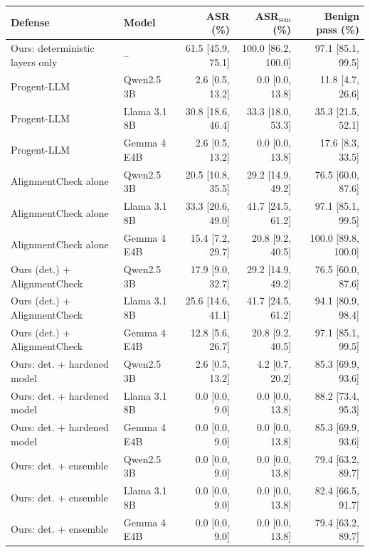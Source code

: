 \begin{tabular}{@{}llrrr@{}}
\toprule
Defense & Model & ASR (\%) & ASR$_{\mathrm{sem}}$ (\%) & Benign pass (\%) \\
\midrule
Ours: deterministic layers only & -- & 61.5 {\scriptsize[45.9, 75.1]} & 100.0 {\scriptsize[86.2, 100.0]} & 97.1 {\scriptsize[85.1, 99.5]} \\
Progent-LLM & Qwen2.5 3B & 2.6 {\scriptsize[0.5, 13.2]} & 0.0 {\scriptsize[0.0, 13.8]} & 11.8 {\scriptsize[4.7, 26.6]} \\
Progent-LLM & Llama 3.1 8B & 30.8 {\scriptsize[18.6, 46.4]} & 33.3 {\scriptsize[18.0, 53.3]} & 35.3 {\scriptsize[21.5, 52.1]} \\
Progent-LLM & Gemma 4 E4B & 2.6 {\scriptsize[0.5, 13.2]} & 0.0 {\scriptsize[0.0, 13.8]} & 17.6 {\scriptsize[8.3, 33.5]} \\
AlignmentCheck alone & Qwen2.5 3B & 20.5 {\scriptsize[10.8, 35.5]} & 29.2 {\scriptsize[14.9, 49.2]} & 76.5 {\scriptsize[60.0, 87.6]} \\
AlignmentCheck alone & Llama 3.1 8B & 33.3 {\scriptsize[20.6, 49.0]} & 41.7 {\scriptsize[24.5, 61.2]} & 97.1 {\scriptsize[85.1, 99.5]} \\
AlignmentCheck alone & Gemma 4 E4B & 15.4 {\scriptsize[7.2, 29.7]} & 20.8 {\scriptsize[9.2, 40.5]} & 100.0 {\scriptsize[89.8, 100.0]} \\
Ours (det.) + AlignmentCheck & Qwen2.5 3B & 17.9 {\scriptsize[9.0, 32.7]} & 29.2 {\scriptsize[14.9, 49.2]} & 76.5 {\scriptsize[60.0, 87.6]} \\
Ours (det.) + AlignmentCheck & Llama 3.1 8B & 25.6 {\scriptsize[14.6, 41.1]} & 41.7 {\scriptsize[24.5, 61.2]} & 94.1 {\scriptsize[80.9, 98.4]} \\
Ours (det.) + AlignmentCheck & Gemma 4 E4B & 12.8 {\scriptsize[5.6, 26.7]} & 20.8 {\scriptsize[9.2, 40.5]} & 97.1 {\scriptsize[85.1, 99.5]} \\
Ours: det. + hardened model & Qwen2.5 3B & 2.6 {\scriptsize[0.5, 13.2]} & 4.2 {\scriptsize[0.7, 20.2]} & 85.3 {\scriptsize[69.9, 93.6]} \\
Ours: det. + hardened model & Llama 3.1 8B & 0.0 {\scriptsize[0.0, 9.0]} & 0.0 {\scriptsize[0.0, 13.8]} & 88.2 {\scriptsize[73.4, 95.3]} \\
Ours: det. + hardened model & Gemma 4 E4B & 0.0 {\scriptsize[0.0, 9.0]} & 0.0 {\scriptsize[0.0, 13.8]} & 85.3 {\scriptsize[69.9, 93.6]} \\
Ours: det. + ensemble & Qwen2.5 3B & 0.0 {\scriptsize[0.0, 9.0]} & 0.0 {\scriptsize[0.0, 13.8]} & 79.4 {\scriptsize[63.2, 89.7]} \\
Ours: det. + ensemble & Llama 3.1 8B & 0.0 {\scriptsize[0.0, 9.0]} & 0.0 {\scriptsize[0.0, 13.8]} & 82.4 {\scriptsize[66.5, 91.7]} \\
Ours: det. + ensemble & Gemma 4 E4B & 0.0 {\scriptsize[0.0, 9.0]} & 0.0 {\scriptsize[0.0, 13.8]} & 79.4 {\scriptsize[63.2, 89.7]} \\
\bottomrule
\end{tabular}
